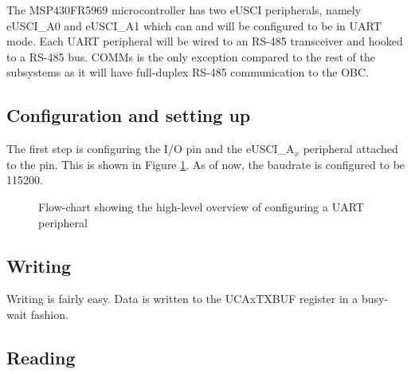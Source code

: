 The MSP430FR5969 microcontroller has two eUSCI peripherals, namely eUSCI\_A0
and eUSCI\_A1 which can and will be configured to be in UART mode. Each UART
peripheral will be wired to an RS-485 transceiver and hooked to a RS-485 bus.
COMMs is the only exception compared to the rest of the subsystems as it will
have full-duplex RS-485 communication to the OBC. \newline

\subsection{Configuration and setting up}

The first step is configuring the I/O pin and the eUSCI\_$ \text{A}_x$
peripheral attached to the pin. This is shown in Figure
\ref{fig:mspuartconfig}. As of now, the baudrate is configured to be 115200. 

\begin{figure}[H]
\centering
{}

\caption{Flow-chart showing the high-level overview of configuring a UART
    peripheral}
\label{fig:mspuartconfig}

\end{figure}

\subsection{Writing}

Writing is fairly easy. Data is written to the UCAxTXBUF register in
a busy-wait fashion. 

\subsection{Reading}


